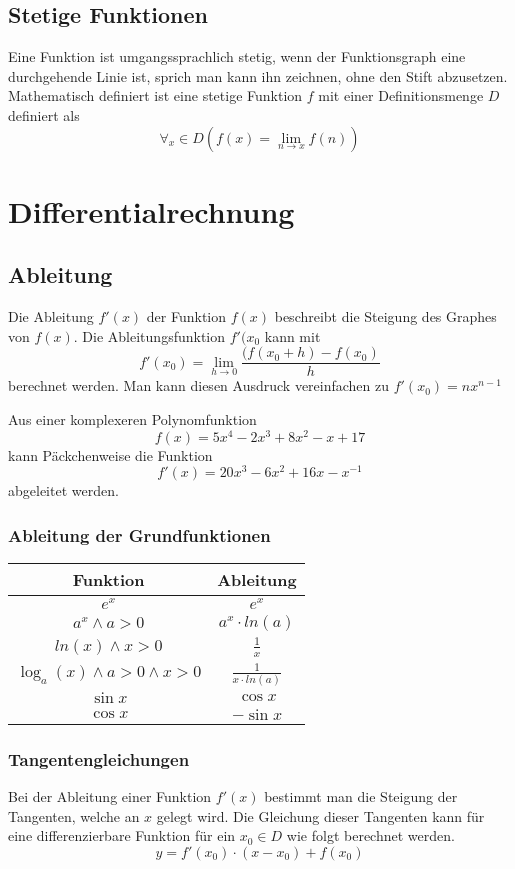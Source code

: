 \documentclass{article}
\begin{document}
\subsection{Stetige Funktionen}
Eine Funktion ist umgangssprachlich stetig, wenn der Funktionsgraph eine durchgehende Linie ist, sprich man kann ihn zeichnen, ohne den Stift abzusetzen.
Mathematisch definiert ist eine stetige Funktion $f$ mit einer Definitionsmenge $D$ definiert als
$$\forall_x \in D (f(x) = \lim_{n \to x}f(n))$$
\section{Differentialrechnung}


\subsection{Ableitung}
Die Ableitung \(f'(x)\) der Funktion \(f(x)\) beschreibt die Steigung des Graphes von \(f(x)\). Die Ableitungsfunktion \(f'(x_0\) kann mit \[f'(x_0)= \lim_{h \to 0} \frac{(f(x_0 + h) - f(x_0)}{h} \]
berechnet werden. Man kann diesen Ausdruck vereinfachen zu \(f'(x_0) = nx^{n-1}\)

Aus einer komplexeren Polynomfunktion \[
		f(x) = 5x^4-2x^3+8x^2-x+17
\]
kann Päckchenweise die Funktion \[
		f'(x) = 20x^3-6x^2+16x-x^{-1}
\] abgeleitet werden.
\subsubsection{Ableitung der Grundfunktionen}
\begin{table}[h!]
		\begin{center}
				\begin{tabular}{c|c}
						\textbf{Funktion} & \textbf{Ableitung} \\
						\hline
						$e^{x}$ & $e^{x}$\\
						\hline
						$a^{x} \land a > 0$ & $a^{x} \cdot ln(a)$\\
						\hline
						$ln(x) \land x > 0$ & $ \frac{1}{x} $ \\
						\hline
						$ \log_{a}(x) \land a > 0 \land x > 0$ & $ \frac{1}{x\cdot ln(a)} $\\
						\hline
						$\sin x$ & $\cos x$ \\
						\hline
						$\cos x$ & $- \sin x$
				\end{tabular}
		\end{center}
\end{table}
\subsubsection{Tangentengleichungen}
Bei der Ableitung einer Funktion $f'(x)$ bestimmt man die Steigung der Tangenten, welche an $x$ gelegt wird. Die Gleichung dieser Tangenten kann für eine differenzierbare Funktion für ein $x_0 \in D$ wie folgt berechnet werden.
$$y = f'(x_0) \cdot (x-x_0) +f(x_0)$$
\end{document}
